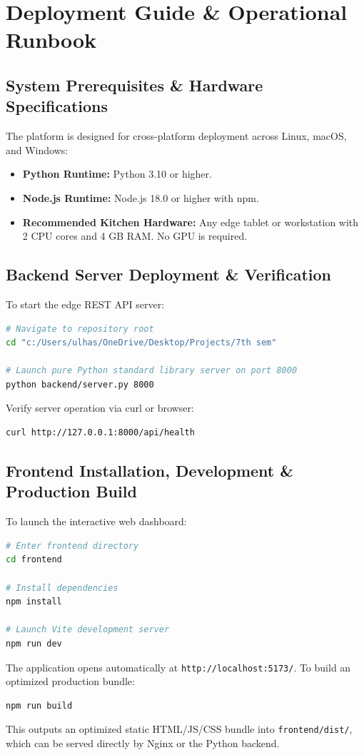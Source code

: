 \documentclass[11pt,a4paper,oneside]{report}
\begin{document}
\chapter{Deployment Guide \& Operational Runbook}

\section{System Prerequisites \& Hardware Specifications}
The platform is designed for cross-platform deployment across Linux, macOS, and Windows:
\begin{itemize}
  \item \textbf{Python Runtime:} Python 3.10 or higher.
  \item \textbf{Node.js Runtime:} Node.js 18.0 or higher with npm.
  \item \textbf{Recommended Kitchen Hardware:} Any edge tablet or workstation with 2 CPU cores and 4 GB RAM. No GPU is required.
\end{itemize}

\section{Backend Server Deployment \& Verification}
To start the edge REST API server:
\begin{lstlisting}[language=bash,caption=Starting the Backend REST Server]
# Navigate to repository root
cd "c:/Users/ulhas/OneDrive/Desktop/Projects/7th sem"

# Launch pure Python standard library server on port 8000
python backend/server.py 8000
\end{lstlisting}
Verify server operation via curl or browser:
\begin{lstlisting}[language=bash,caption=Verifying Server Health Endpoint]
curl http://127.0.0.1:8000/api/health
\end{lstlisting}

\section{Frontend Installation, Development \& Production Build}
To launch the interactive web dashboard:
\begin{lstlisting}[language=bash,caption=Frontend Installation and Startup]
# Enter frontend directory
cd frontend

# Install dependencies
npm install

# Launch Vite development server
npm run dev
\end{lstlisting}
The application opens automatically at \texttt{http://localhost:5173/}. To build an optimized production bundle:
\begin{lstlisting}[language=bash,caption=Production Build Compilation]
npm run build
\end{lstlisting}
This outputs an optimized static HTML/JS/CSS bundle into \texttt{frontend/dist/}, which can be served directly by Nginx or the Python backend.
\end{document}
